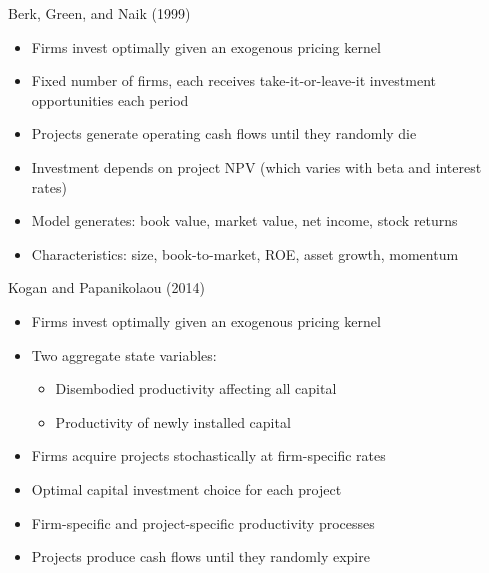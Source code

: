\documentclass[aspectratio=169]{beamer}
\begin{document}
\begin{frame}{Berk, Green, and Naik (1999)}
\begin{itemize}
  \item Firms invest optimally given an exogenous pricing kernel
  \item Fixed number of firms, each receives take-it-or-leave-it investment opportunities each period
  \item Projects generate operating cash flows until they randomly die
  \item Investment depends on project NPV (which varies with beta and interest rates)
  \item Model generates: book value, market value, net income, stock returns
  \item Characteristics: size, book-to-market, ROE, asset growth, momentum
\end{itemize}
\end{frame}

\begin{frame}{Kogan and Papanikolaou (2014)}
\begin{itemize}
  \item Firms invest optimally given an exogenous pricing kernel
  \item Two aggregate state variables:
  \begin{itemize}
    \item Disembodied productivity affecting all capital
    \item Productivity of newly installed capital
  \end{itemize}
  \item Firms acquire projects stochastically at firm-specific rates
  \item Optimal capital investment choice for each project
  \item Firm-specific and project-specific productivity processes
  \item Projects produce cash flows until they randomly expire
\end{itemize}
\end{frame}
\end{document}
